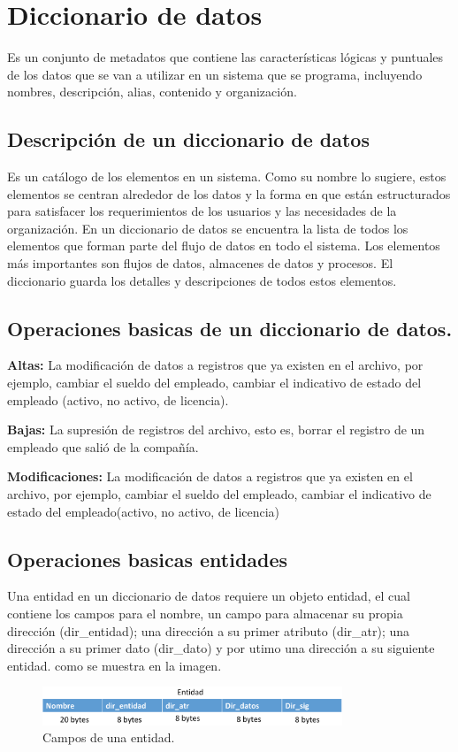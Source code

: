\chapter[Diccionario de datos]{Diccionario de datos}
Es un conjunto de metadatos que contiene las características lógicas y puntuales de los datos que se van a utilizar en un sistema que se programa, incluyendo nombres, descripción, alias, contenido y organización.

\section{Descripción de un diccionario de datos}
Es un catálogo de los elementos en un sistema. Como su nombre lo sugiere, estos elementos se centran alrededor de los datos y la forma en que están estructurados para satisfacer los requerimientos de los usuarios y las necesidades de la organización. En un diccionario de datos se encuentra la lista de todos los elementos que forman parte del flujo de datos en todo el sistema. Los elementos más importantes son flujos de datos, almacenes de datos y procesos. El diccionario guarda los detalles y descripciones de todos estos elementos. 

\section{Operaciones basicas de un diccionario de datos.}

{\bf Altas:} La modificación de datos a registros que ya existen en el archivo, por ejemplo, cambiar el sueldo del empleado, cambiar el indicativo de estado del empleado (activo, no activo, de licencia).

{\bf Bajas:} La supresión de registros del archivo, esto es, borrar el registro de un empleado que salió de la compañía.

{\bf Modificaciones:} La modificación de datos a registros que ya existen en el archivo, por ejemplo, cambiar el sueldo del empleado, cambiar el indicativo de estado del empleado(activo, no activo, de licencia)

\newpage
\section{Operaciones basicas entidades}

Una entidad en un diccionario de datos requiere un objeto entidad, el cual contiene los campos para el nombre,
un campo para almacenar su propia dirección (dir\_entidad); una dirección a su primer atributo (dir\_atr); una dirección a su primer
dato (dir\_dato) y por utimo una dirección a su siguiente entidad. como se muestra en la imagen.
\begin{figure}[!ht]
\begin{center}
  \includegraphics[width=0.8\textwidth]{secciones/ejemploA/img1.png}
  \caption{Campos de una entidad.}
\end{center}
\end{figure}

